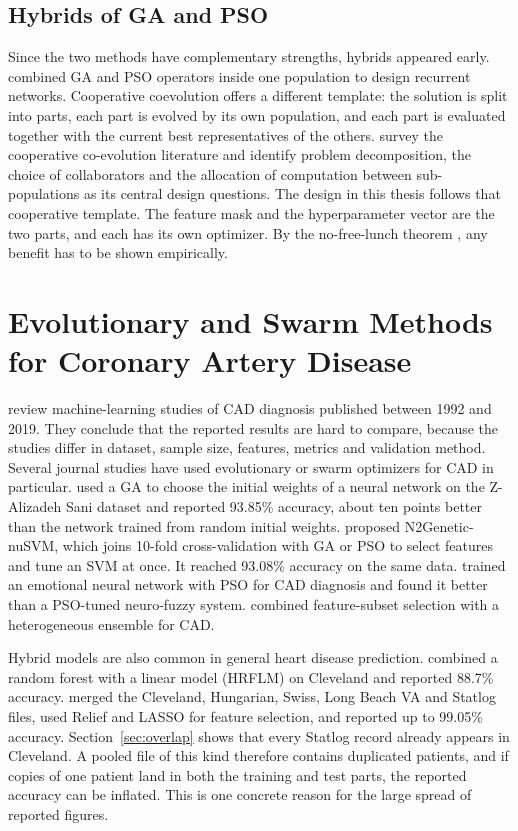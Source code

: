 \documentclass[MTech]{ugthesis}
\begin{document}
\subsection{Hybrids of GA and PSO}
Since the two methods have complementary strengths, hybrids appeared early. \citet{juang2004gapso} combined GA and PSO operators inside one population to design recurrent networks. Cooperative coevolution \citep{potter1994cc} offers a different template: the solution is split into parts, each part is evolved by its own population, and each part is evaluated together with the current best representatives of the others. \citet{ma2019ccsurvey} survey the cooperative co-evolution literature and identify problem decomposition, the choice of collaborators and the allocation of computation between sub-populations as its central design questions. The design in this thesis follows that cooperative template. The feature mask and the hyperparameter vector are the two parts, and each has its own optimizer. By the no-free-lunch theorem \citep{wolpert1997nfl}, any benefit has to be shown empirically.

\section{Evolutionary and Swarm Methods for Coronary Artery Disease}
\citet{alizadehsani2019review} review machine-learning studies of \ac{CAD} diagnosis published between 1992 and 2019. They conclude that the reported results are hard to compare, because the studies differ in dataset, sample size, features, metrics and validation method. Several journal studies have used evolutionary or swarm optimizers for CAD in particular. \citet{arabasadi2017nnga} used a GA to choose the initial weights of a neural network on the Z-Alizadeh Sani dataset and reported 93.85\% accuracy, about ten points better than the network trained from random initial weights. \citet{abdar2019n2genetic} proposed N2Genetic-nuSVM, which joins 10-fold cross-validation with GA or PSO to select features and tune an SVM at once. It reached 93.08\% accuracy on the same data. \citet{shahid2020psoemnn} trained an emotional neural network with PSO for CAD diagnosis and found it better than a PSO-tuned neuro-fuzzy system. \citet{velusamy2021ensemble} combined feature-subset selection with a heterogeneous ensemble for CAD.

Hybrid models are also common in general heart disease prediction. \citet{mohan2019hrflm} combined a random forest with a linear model (HRFLM) on Cleveland and reported 88.7\% accuracy. \citet{ghosh2021relief} merged the Cleveland, Hungarian, Swiss, Long Beach VA and Statlog files, used Relief and LASSO for feature selection, and reported up to 99.05\% accuracy. Section~\ref{sec:overlap} shows that every Statlog record already appears in Cleveland. A pooled file of this kind therefore contains duplicated patients, and if copies of one patient land in both the training and test parts, the reported accuracy can be inflated. This is one concrete reason for the large spread of reported figures.
\end{document}

